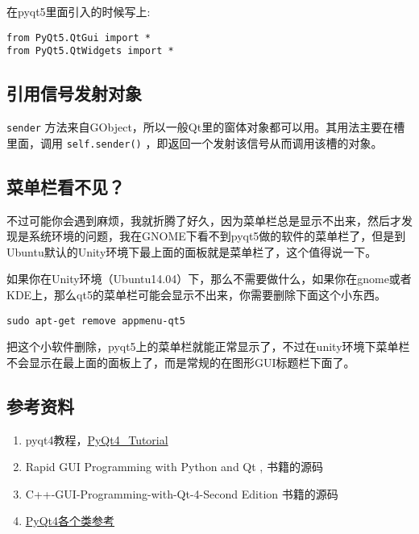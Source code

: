 \documentclass[11pt,oneside]{article}
\begin{document}
在pyqt5里面引入的时候写上:
\begin{Verbatim}
from PyQt5.QtGui import *
from PyQt5.QtWidgets import *
\end{Verbatim}

\subsection{引用信号发射对象}
\label{sec:orgheadline47}
\texttt{sender} 方法来自GObject，所以一般Qt里的窗体对象都可以用。其用法主要在槽里面，调用 \texttt{self.sender()} ，即返回一个发射该信号从而调用该槽的对象。

\subsection{菜单栏看不见？}
\label{sec:orgheadline48}
不过可能你会遇到麻烦，我就折腾了好久，因为菜单栏总是显示不出来，然后才发现是系统环境的问题，我在GNOME下看不到pyqt5做的软件的菜单栏了，但是到Ubuntu默认的Unity环境下最上面的面板就是菜单栏了，这个值得说一下。

如果你在Unity环境（Ubuntu14.04）下，那么不需要做什么，如果你在gnome或者KDE上，那么qt5的菜单栏可能会显示不出来，你需要删除下面这个小东西。
\begin{verbatim}
sudo apt-get remove appmenu-qt5
\end{verbatim}

把这个小软件删除，pyqt5上的菜单栏就能正常显示了，不过在unity环境下菜单栏不会显示在最上面的面板上了，而是常规的在图形GUI标题栏下面了。


\subsection{参考资料}
\label{sec:orgheadline49}
\begin{enumerate}
\item pyqt4教程，\href{http://blog.cx125.com/books/PyQt4_Tutorial/}{PyQt4\_Tutorial}

\item Rapid GUI Programming with Python and Qt , 书籍的源码

\item C++-GUI-Programming-with-Qt-4-Second Edition 书籍的源码

\item \href{http://pyqt.sourceforge.net/Docs/PyQt4/classes.html}{PyQt4各个类参考}
\end{enumerate}
\end{document}
